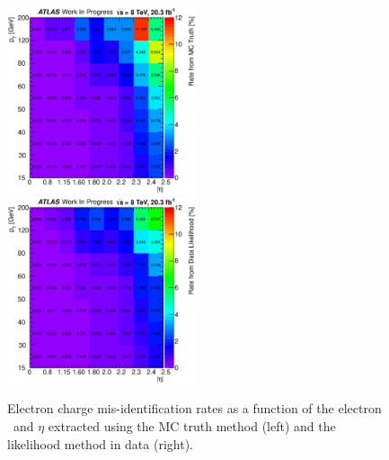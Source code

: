 \begin{figure}[htp]
\centering
\includegraphics[width=0.495\textwidth]{figures/ChargeMisID/Nov5_2015_TruthRates_Plot.eps}
\includegraphics[width=0.495\textwidth]{figures/ChargeMisID/Nov5_2015_DataRates_Plot.eps}
\caption{Electron charge mis-identification rates as a function of
the electron \pt~and $\eta$ extracted using the MC
truth method (left) and the likelihood method in data (right). }
\label{fig:chargemisid_rates_contour}
\end{figure}

